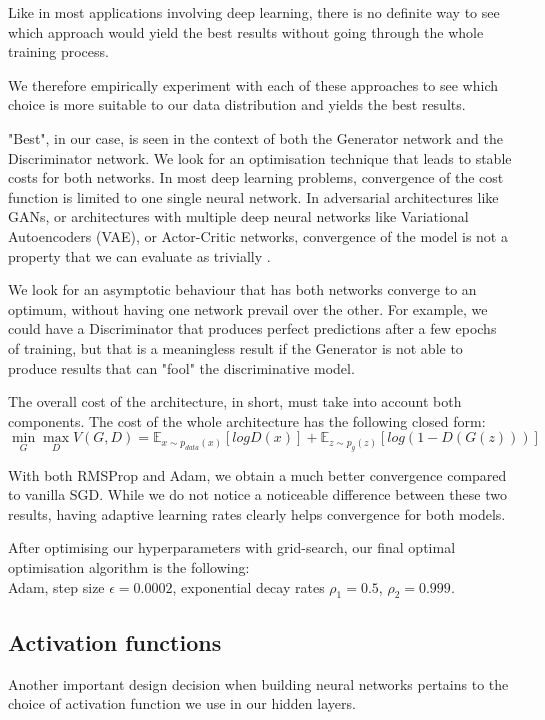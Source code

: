 Like in most applications involving deep learning, there is no definite way to see which approach would yield the best results without going through the whole training process.

We therefore empirically experiment with each of these approaches to see which choice is more suitable to our data distribution and yields the best results.

"Best", in our case, is seen in the context of both the Generator network and the Discriminator network. We look for an optimisation technique that leads to stable costs for both networks. In most deep learning problems, convergence of the cost function is limited to one single neural network. In adversarial architectures like GANs, or architectures with multiple deep neural networks like Variational Autoencoders (VAE), or Actor-Critic networks, convergence of the model is not a property that we can evaluate as trivially \citep{kingma2013auto, grondman2012survey}.

We look for an asymptotic behaviour that has both networks converge to an optimum, without having one network prevail over the other. For example, we could have a Discriminator that produces perfect predictions after a few epochs of training, but that is a meaningless result if the Generator is not able to produce results that can "fool" the discriminative model.

The overall cost of the architecture, in short, must take into account both components. The cost of the whole architecture has the following closed form:
\[\min_{G} \max_{D} V(G, D) = \mathbb{E}_{x\sim p_{data}(x)}[log D(x)] + \mathbb{E}_{z \sim p_{g}(z)}[log(1-D(G(z)))] \]

With both RMSProp and Adam, we obtain a much better convergence compared to vanilla SGD. While we do not notice a noticeable difference between these two results, having adaptive learning rates clearly helps convergence for both models.

After optimising our hyperparameters with grid-search, our final optimal optimisation algorithm is the following: \\
Adam, step size $\epsilon = 0.0002$, exponential decay rates $\rho_1 = 0.5$, $\rho_2 = 0.999$.




\subsection{Activation functions}
Another important design decision when building neural networks pertains to the choice of activation function we use in our hidden layers.


